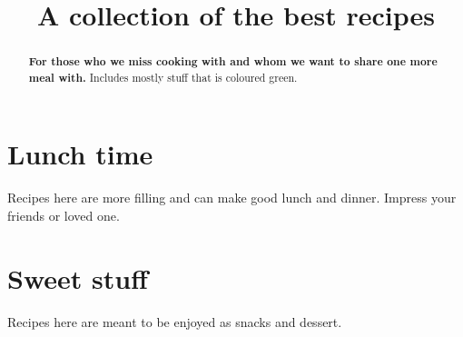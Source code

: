 \documentclass[%
a4paper,
11pt
]{article}
\begin{document}
\title{A collection of the best recipes}
\maketitle

\begin{abstract}
    \noindent \textbf{For those who we miss cooking with and whom we want to share one more meal with.} Includes mostly stuff that is coloured green.
\end{abstract}

\tableofcontents

\pagebreak


\section{Lunch time}
Recipes here are more filling and can make good lunch and dinner. Impress your friends or loved one.






\section{Sweet stuff}
Recipes here are meant to be enjoyed as snacks and dessert.



\end{document}
